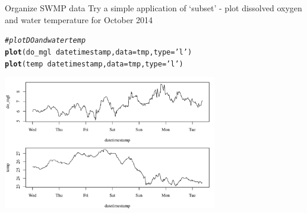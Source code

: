 \documentclass[xcolor=svgnames]{beamer}\usepackage[]{graphicx}\usepackage[]{color}
\makeatletter
\newcommand{\hlstr}[1]{\textcolor[rgb]{0.192,0.494,0.8}{#1}}%
\newcommand{\hlcom}[1]{\textcolor[rgb]{0.678,0.584,0.686}{\textit{#1}}}%
\newcommand{\hlopt}[1]{\textcolor[rgb]{0,0,0}{#1}}%
\newcommand{\hlstd}[1]{\textcolor[rgb]{0.345,0.345,0.345}{#1}}%
\newcommand{\hlkwc}[1]{\textcolor[rgb]{0.333,0.667,0.333}{#1}}%
\newcommand{\hlkwd}[1]{\textcolor[rgb]{0.737,0.353,0.396}{\textbf{#1}}}%
\newenvironment{kframe}{%
 \def\at@end@of@kframe{}%
 \ifinner\ifhmode%
  \def\at@end@of@kframe{\end{minipage}}%
  \begin{minipage}{\columnwidth}%
 \fi\fi%
 \def\FrameCommand##1{\hskip\@totalleftmargin \hskip-\fboxsep
 \colorbox{shadecolor}{##1}\hskip-\fboxsep
     \hskip-\linewidth \hskip-\@totalleftmargin \hskip\columnwidth}%
 \MakeFramed {\advance\hsize-\width
   \@totalleftmargin\z@ \linewidth\hsize
   \@setminipage}}%
 {\par\unskip\endMakeFramed%
 \at@end@of@kframe}
\newenvironment{knitrout}{}{} %
\makeatother
\begin{document}
\begin{frame}[containsverbatim]{Organize SWMP data}
Try a simple application of `subset' - plot dissolved oxygen and water temperature for October 2014
\begin{knitrout}\scriptsize
{}\color{fgcolor}\begin{kframe}
\begin{alltt}
\hlcom{# plot DO and water temp}
\hlkwd{plot}\hlstd{(do_mgl} \hlopt{~} \hlstd{datetimestamp,} \hlkwc{data} \hlstd{= tmp,} \hlkwc{type} \hlstd{=} \hlstr{'l'}\hlstd{)}
\hlkwd{plot}\hlstd{(temp} \hlopt{~} \hlstd{datetimestamp,} \hlkwc{data} \hlstd{= tmp,} \hlkwc{type} \hlstd{=} \hlstr{'l'}\hlstd{)}
\end{alltt}
\end{kframe}
\end{knitrout}
\begin{knitrout}\scriptsize
{}\color{fgcolor}

{\centering \includegraphics[width=0.7\textwidth]{figure/sub_plo} 

}



\end{knitrout}
\end{frame}
\end{document}
